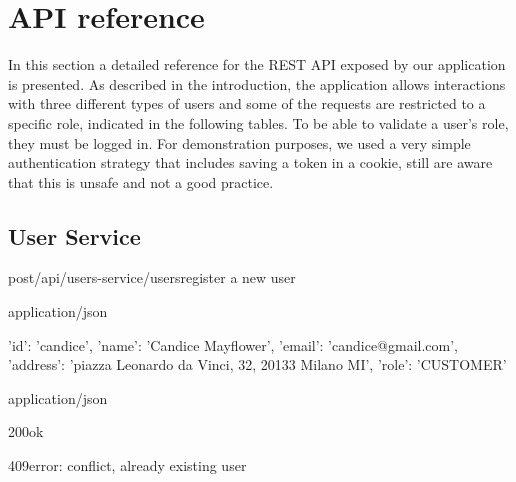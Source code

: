 \section{API reference}
\label{sec:api}
In this section a detailed reference for the REST API exposed by our application is presented. As described in the introduction, the application allows interactions with three different types of users and some of the requests are restricted to a specific role, indicated in the following tables. To be able to validate a user's role, they must be logged in. For demonstration purposes, we used a very simple authentication strategy that includes saving a token in a cookie, still are aware that this is unsafe and not a good practice.

\renewcommand{\getGetColor}{getYellow}
\renewcommand{\getGetBorderColor}{getYellowBorder}
\renewcommand{\getGetLightColor}{getLightYellow}

\subsection{User Service}
\begin{apiRoute}{post}{/api/users-service/users}{register a new user}
	\begin{routeParameter}
	\end{routeParameter}
	\begin{routeRequest}{application/json}
		\begin{routeRequestBody}
{
    'id': 'candice',
    'name': 'Candice Mayflower',
    'email': 'candice@gmail.com',
    'address': 'piazza Leonardo da Vinci, 32, 20133 Milano MI',
    'role': 'CUSTOMER'
}
		\end{routeRequestBody}
	\end{routeRequest}
	\begin{routeResponse}{application/json}
	    \begin{routeResponseItem}{200}{ok}
    		\begin{routeResponseItemBody}
        	\end{routeResponseItemBody} 
	    \end{routeResponseItem}
        \begin{routeResponseItem}{409}{error: conflict, already existing user}
			\begin{routeResponseItemBody}
			\end{routeResponseItemBody}
		\end{routeResponseItem}
	\end{routeResponse}
\end{apiRoute}

